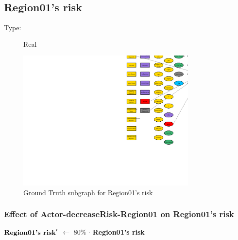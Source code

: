 \documentclass{article}%
\begin{document}
%
\subsection{Region01's risk}%
\label{subsec:Region01's risk}%
\begin{description}%
\item[Type:]%
Real%
\end{description}%


\begin{figure}[ht]%
\centering%
\includegraphics[width=0.8\textwidth]{images/riskOfRegion01.png}%
\caption{Ground Truth subgraph for Region01's risk}%
\end{figure}

%
\subsubsection{Effect of Actor{-}decreaseRisk{-}Region01 on Region01's risk}%
\label{ssubsec:Effect of Actor{-}decreaseRisk{-}Region01 on Region01's risk}%
\begin{flushleft}%
$\mbox{\textbf{Region01's risk}} '$%
$\leftarrow$%
80\%%
$\cdot$%
\textbf{Region01's risk}%
\end{flushleft}

%
\end{document}

